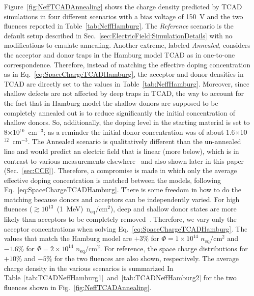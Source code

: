 Figure~\ref{fig:NeffTCADAnnealing} shows the charge density predicted by TCAD simulations in four 
different scenarios with a bias voltage of 150~V and the two fluences reported in Table~\ref{tab:NeffHamburg}.  The \textit{Reference} scenario is the default setup described in Sec.~\ref{sec:ElectricField:SimulationDetails} with no modifications to emulate annealing.  Another extreme, labeled \textit{Annealed}, considers the acceptor and donor traps in the Hamburg model TCAD as in one-to-one correspondence.  Therefore, instead of matching the effective doping concentration as in Eq.~\ref{eq:SpaceChargeTCADHamburg}, the acceptor and donor densities in TCAD are directly set to the values in Table~\ref{tab:NeffHamburg}.  Moreover, since shallow defects are not affected by deep traps in TCAD, the way to account for the fact that in Hamburg model the shallow donors are supposed to be completely annealed out is to reduce significantly the initial concentration of shallow donors. So, additionally, the doping level in the starting material is set to 8$\times$10$^{10}$~cm$^{-3}$;  as a reminder the initial donor concentration was of about 1.6$\times$10$^{12}$~cm$^{-3}$.   The Annealed scenario is qualitatively different than the un-annealed line and would predict an electric field that is linear (more below), which is in contrast to various measurements elsewhere~\cite{CHIOCHIA2006} and also shown later in this paper (Sec.~\ref{sec:CCE}).  Therefore, a compromise is made in which only the average effective doping concentration is matched between the models, following Eq.~\ref{eq:SpaceChargeTCADHamburg}.  There is some freedom in how to do the matching because donors and acceptors can be independently varied.  For high fluences 
($\gtrsim10^{13}$~(1~MeV)~n$_\text{eq}/\text{cm}^{2}$), deep and shallow donor states are more likely than acceptors to be completely removed~\cite{moll-thesis}.  Therefore, we vary only the acceptor concentrations when solving Eq.~\ref{eq:SpaceChargeTCADHamburg}.   The values that match the Hamburg model are $+3\%$ for $\Phi=1\times10^{14}$ $n_\text{eq}/\text{cm}^2$ and $-1.6\%$ for $\Phi=2\times10^{14}$ $n_\text{eq}/\text{cm}^2$.  For reference, the space charge distributions for $+10\%$ and $-5\%$ for the two fluences are also shown, respectively.   The average charge density in the various scenarios is summarized In Table~\ref{tab:TCADNeffHamburg1}~and~\ref{tab:TCADNeffHamburg2} for the two fluences shown in Fig.~\ref{fig:NeffTCADAnnealing}.

